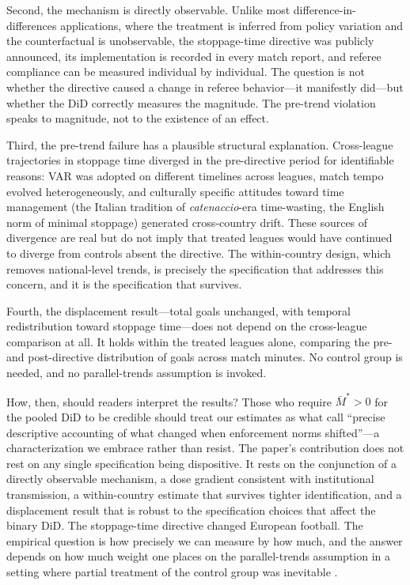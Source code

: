 Second, the mechanism is directly observable. Unlike most
difference-in-differences applications, where the treatment is
inferred from policy variation and the counterfactual is
unobservable, the stoppage-time directive was publicly announced,
its implementation is recorded in every match report, and referee
compliance can be measured individual by individual. The question is
not whether the directive caused a change in referee behavior---it
manifestly did---but whether the DiD correctly measures the
magnitude. The pre-trend violation speaks to magnitude, not to the
existence of an effect.

Third, the pre-trend failure has a plausible structural explanation.
Cross-league trajectories in stoppage time diverged in the
pre-directive period for identifiable reasons: VAR was adopted on
different timelines across leagues, match tempo evolved
heterogeneously, and culturally specific attitudes toward time
management (the Italian tradition of \textit{catenaccio}-era
time-wasting, the English norm of minimal stoppage) generated
cross-country drift. These sources of divergence are real but do
not imply that treated leagues would have continued to diverge from
controls absent the directive. The within-country design, which
removes national-level trends, is precisely the specification that
addresses this concern, and it is the specification that survives.

Fourth, the displacement result---total goals unchanged, with
temporal redistribution toward stoppage time---does not depend on
the cross-league comparison at all. It holds within the treated
leagues alone, comparing the pre- and post-directive distribution
of goals across match minutes. No control group is needed, and no
parallel-trends assumption is invoked.

How, then, should readers interpret the results? Those who require
$\bar{M}^* > 0$ for the pooled DiD to be credible should treat
our estimates as what \citet{roth2022pretest} call ``precise
descriptive accounting of what changed when enforcement norms
shifted''---a characterization we embrace rather than resist. The
paper's contribution does not rest on any single specification being
dispositive. It rests on the conjunction of a directly observable
mechanism, a dose gradient consistent with institutional
transmission, a within-country estimate that survives tighter
identification, and a displacement result that is robust to the
specification choices that affect the binary DiD. The stoppage-time
directive changed European football. The empirical question is how
precisely we can measure by how much, and the answer depends on how
much weight one places on the parallel-trends assumption in a
setting where partial treatment of the control group was inevitable
\citep{rothetal2023, imbens2009recent}.
